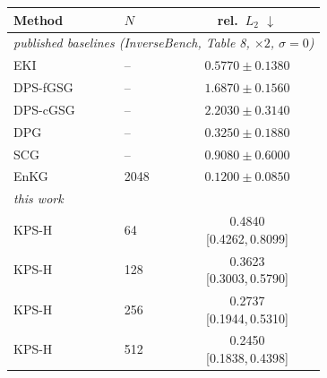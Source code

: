 \small
%
\begin{tabular}{llc}
\toprule
Method & $N$ & rel.\ $L_2$ $\downarrow$ \\
\midrule
\multicolumn{3}{l}{\emph{published baselines (InverseBench, Table 8, $\times 2$, $\sigma=0$)}} \\
EKI & -- & $0.5770 \pm 0.1380$ \\
DPS-fGSG & -- & $1.6870 \pm 0.1560$ \\
DPS-cGSG & -- & $2.2030 \pm 0.3140$ \\
DPG & -- & $0.3250 \pm 0.1880$ \\
SCG & -- & $0.9080 \pm 0.6000$ \\
EnKG & 2048 & $0.1200 \pm 0.0850$ \\
\midrule
\multicolumn{3}{l}{\emph{this work}} \\
\shortstack[l]{KPS-H\\\strut} & \shortstack{64\\\strut} & \shortstack{0.4840\\{\tiny[0.4262,\,0.8099]}} \\
\shortstack[l]{KPS-H\\\strut} & \shortstack{128\\\strut} & \shortstack{0.3623\\{\tiny[0.3003,\,0.5790]}} \\
\shortstack[l]{KPS-H\\\strut} & \shortstack{256\\\strut} & \shortstack{0.2737\\{\tiny[0.1944,\,0.5310]}} \\
\shortstack[l]{KPS-H\\\strut} & \shortstack{512\\\strut} & \shortstack{0.2450\\{\tiny[0.1838,\,0.4398]}} \\
\bottomrule
\end{tabular}
